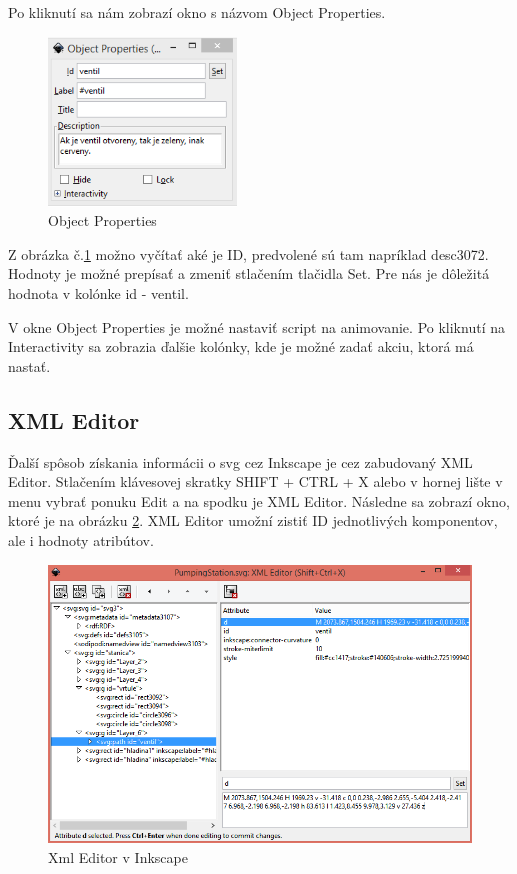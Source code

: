 Po kliknutí sa nám zobrazí okno s názvom Object Properties. 

\begin{figure}[H]
	\begin{center}
		\includegraphics [width=5cm]  {obrazky/obr3.png}
		\caption{Object Properties}
		\label{picture3}
	\end{center}
\end{figure}


Z obrázka č.\ref{picture3} možno vyčítať aké je ID, predvolené sú tam napríklad desc3072. Hodnoty je možné prepísať a zmeniť stlačením tlačidla Set. Pre nás je dôležitá hodnota v kolónke id - ventil. 

V okne Object Properties je možné nastaviť script na animovanie. Po kliknutí na Interactivity sa zobrazia ďalšie kolónky, kde je možné zadať akciu, ktorá má nastať.  


\subsection{XML Editor}
Ďalší spôsob získania informácii o svg cez Inkscape je cez zabudovaný XML Editor.
Stlačením klávesovej skratky SHIFT + CTRL + X alebo v hornej lište v menu vybrať ponuku Edit a na spodku je XML Editor. Následne sa zobrazí okno, ktoré je na obrázku \ref{xmlEditor}. XML Editor umožní zistiť ID jednotlivých komponentov, ale i hodnoty atribútov. 

\begin{figure}[H]
	\begin{center}
		\includegraphics[width=0.6\linewidth]  {obrazky/XmlEditor2.png}
		\caption{Xml Editor v Inkscape}
		\label{xmlEditor}
	\end{center}
\end{figure}




